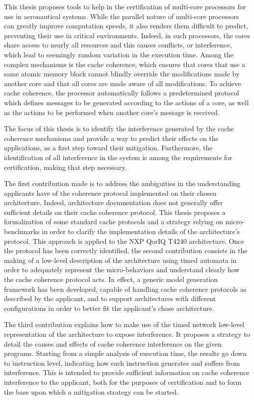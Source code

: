 This thesis proposes tools to help in the certification of multi-core
processors for use in aeronautical systems. While the parallel nature of
multi-core processors can greatly improve computation speeds, it also renders
them difficult to predict, preventing their use in critical environments.
Indeed, in such processors, the cores share access to nearly all resources and
this causes conflicts, or interference, which lead to seemingly random
variation in the execution time. Among the complex mechanisms is the cache
coherence, which ensures that cores that use a same atomic memory block cannot
blindly override the modifications made by another core and that all cores are
made aware of all modifications. To achieve cache coherence, the processor
automatically follows a predetermined protocol which defines messages to be
generated according to the actions of a core, as well as the actions to be
performed when another core's message is received.

The focus of this thesis is to identify the interference generated by the cache
coherence mechanisms and provide a way to predict their effects on the
applications, as a first step toward their mitigation. Furthermore, the
identification of all interference in the system is among the requirements for
certification, making that step necessary.

The first contribution made is to address the ambiguities in the understanding
applicants have of the coherence protocol implemented on their chosen
architecture. Indeed, architecture documentation does not generally offer
sufficient details on their cache coherence protocol. This thesis proposes a
formalization of some standard cache protocols and a strategy relying on
micro-benchmarks in order to clarify the implementation details of the
architecture's protocol. This approach is applied to the NXP QorIQ T4240
architecture. Once the protocol has been correctly identified, the second
contribution consists in the making of a low-level description of the
architecture using timed automata in order to adequately represent the
micro-behaviors and understand clearly how the cache coherence protocol acts. In
effect, a generic model generation framework has been developed, capable of
handling cache coherence protocols as described by the applicant, and to
support architectures with different configurations in order to better fit the
applicant's chose architecture.

The third contribution explains how to make use of the timed network low-level
representation of the architecture to expose interference. It proposes a
strategy to detail the causes and effects of cache coherence interference on
the given programs. Starting from a simple analysis of execution time, the
results go down to instruction level, indicating how each instruction generates
and suffers from interference. This is intended to provide sufficient
information on cache coherence interference to the applicant, both for the
purposes of certification and to form the base upon which a mitigation strategy
can be started.
